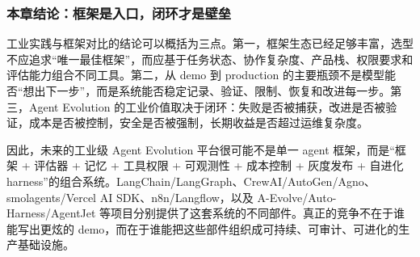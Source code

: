 \subsubsection{本章结论：框架是入口，闭环才是壁垒}

工业实践与框架对比的结论可以概括为三点。第一，框架生态已经足够丰富，选型不应追求``唯一最佳框架''，而应基于任务状态、协作复杂度、产品栈、权限要求和评估能力组合不同工具。第二，从 demo 到 production 的主要瓶颈不是模型能否``想出下一步''，而是系统能否稳定记录、验证、限制、恢复和改进每一步。第三，Agent Evolution 的工业价值取决于闭环：失败是否被捕获，改进是否被验证，成本是否被控制，安全是否被强制，长期收益是否超过运维复杂度。

因此，未来的工业级 Agent Evolution 平台很可能不是单一 agent 框架，而是``框架 + 评估器 + 记忆 + 工具权限 + 可观测性 + 成本控制 + 灰度发布 + 自进化 harness''的组合系统。LangChain/LangGraph、CrewAI/AutoGen/Agno、smolagents/Vercel AI SDK、n8n/Langflow，以及 A-Evolve/Auto-Harness/AgentJet 等项目分别提供了这套系统的不同部件。真正的竞争不在于谁能写出更炫的 demo，而在于谁能把这些部件组织成可持续、可审计、可进化的生产基础设施。
